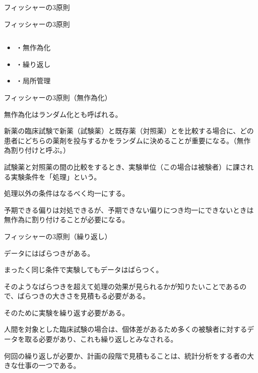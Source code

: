 \documentclass[dvipdfmx, autodetect-engine, aspectratio=169, 10.5pt]{beamer}
\begin{document}
\begin{frame}{フィッシャーの3原則}

	フィッシャーの3原則

	${}$

	\begin{itemize}
		\item ・無作為化
		\item ・繰り返し
		\item ・局所管理
	\end{itemize}

\end{frame}

\begin{frame}{フィッシャーの3原則（無作為化）}

	無作為化はランダム化とも呼ばれる。

	新薬の臨床試験で新薬（試験薬）と既存薬（対照薬）とを比較する場合に、どの患者にどちらの薬剤を投与するかをランダムに決めることが重要になる。（無作為割り付けと呼ぶ。）

	試験薬と対照薬の間の比較をするとき、実験単位（この場合は被験者）に課される実験条件を「処理」という。

	処理以外の条件はなるべく均一にする。

	予期できる偏りは対処できるが、予期できない偏りにつき均一にできないときは無作為に割り付けることが必要になる。

\end{frame}

\begin{frame}{フィッシャーの3原則（繰り返し）}

	データにはばらつきがある。

	まったく同じ条件で実験してもデータはばらつく。

	そのようなばらつきを超えて処理の効果が見られるかが知りたいことであるので、ばらつきの大きさを見積もる必要がある。

	そのために実験を繰り返す必要がある。

	人間を対象とした臨床試験の場合は、個体差があるため多くの被験者に対するデータを取る必要があり、これも繰り返しとみなされる。

	何回の繰り返しが必要か、計画の段階で見積もることは、統計分析をする者の大きな仕事の一つである。

\end{frame}
\end{document}
